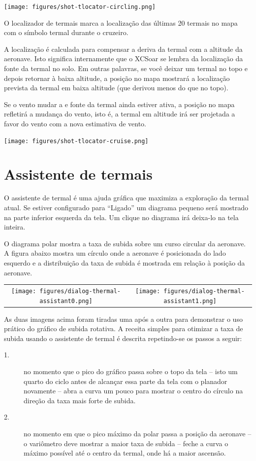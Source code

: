 \begin{center}
\texttt{[image: figures/shot-tlocator-circling.png]}
\end{center}

O localizador de termais marca a localização das últimas 20 termais no mapa com o símbolo termal durante o cruzeiro.

A localização é calculada para compensar a deriva da termal com a altitude da aeronave.  Isto significa internamente que o XCSoar se lembra da localização da fonte da termal no solo.  Em outras palavras, se você deixar um termal no topo e depois retornar à baixa altitude, a posição no mapa mostrará a localização prevista da termal em baixa altitude (que derivou menos do que no topo).

Se o vento mudar a e fonte da termal ainda estiver ativa, a posição no mapa refletirá a mudança do vento, isto é, a termal em altitude irá ser projetada a favor do vento com a nova estimativa de vento.

\begin{center}
\texttt{[image: figures/shot-tlocator-cruise.png]}
\end{center}


\section{Assistente de termais}\label{sec:thermal-assistant}

O assistente de termal é uma ajuda gráfica que maximiza a exploração da termal atual.  Se estiver configurado para “Ligado”  um diagrama pequeno será mostrado na parte inferior esquerda da tela.  Um clique no diagrama irá deixa-lo na tela inteira.

O diagrama polar mostra a taxa de subida sobre um curso circular da aeronave.  A figura abaixo mostra um círculo onde a aeronave é posicionada do lado esquerdo e a distribuição da taxa de subida é mostrada em relação à posição da aeronave.


\begin{tabular}{c c}
\texttt{[image: figures/dialog-thermal-assistant0.png]}&
\texttt{[image: figures/dialog-thermal-assistant1.png]}\\
\end{tabular}

As duas imagens acima foram tiradas uma após a outra para demonstrar o uso prático do gráfico de subida rotativa.  A receita simples para otimizar a taxa de subida usando o assistente de termal é descrita repetindo-se os passos a seguir:
\begin{description}
\item[1.]  no momento que o pico do gráfico passa sobre o topo da tela – isto um quarto do ciclo antes de alcançar essa parte da tela com o planador novamente – abra a curva um pouco para mostrar o centro do círculo na direção da taxa mais forte de subida.
\item[2.]  no momento em que o pico máximo da polar passa a posição da aeronave – o variômetro deve mostrar a maior taxa de subida – feche a curva o máximo possível até o centro da termal, onde há a maior ascensão.
\end{description}


